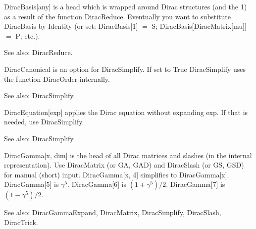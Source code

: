 DiracBasis[any] is a head which is wrapped around Dirac structures (and the 1) as a result of the function DiracReduce. Eventually you
  want to substitute DiracBasis by Identity (or set: DiracBasis[1] \(=\) S; DiracBasis[DiracMatrix[mu]] \(=\) P; etc.).

See also: DiracReduce.



DiracCanonical is an option for DiracSimplify. If set to True DiracSimplify uses the function DiracOrder internally.

See also: DiracSimplify.



DiracEquation[exp] applies the Dirac equation without expanding exp. If that is needed, use DiracSimplify.

See also:  DiracSimplify.








DiracGamma[x, dim] is the head of all Dirac matrices and slashes (in the internal representation). Use DiracMatrix (or GA, GAD) and
  DiracSlash (or GS, GSD) for manual (short) input. DiracGamma[x, 4] simplifies to DiracGamma[x]. DiracGamma[5] is \({{\gamma }^5}\). DiracGamma[6]
is \((1+{{\gamma }^5})/2.\) DiracGamma[7] is \((1-{{\gamma }^5})/2.\)

See also:  DiracGammaExpand, DiracMatrix, DiracSimplify, DiracSlash, DiracTrick.





\dispSFoutmath{
{{\gamma }^{\alpha }}
}

